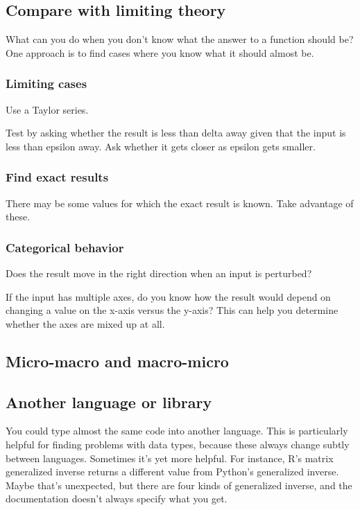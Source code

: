 \documentclass[fleqn,10pt]{olplainarticle}
\begin{document}
\subsection{Compare with limiting theory}\label{sec:limits}

What can you do when you don't know what the answer to
a function should be? One approach is to find cases
where you know what it should almost be.

\subsubsection{Limiting cases}
Use a Taylor series.

Test by asking whether the result is less than delta away
given that the input is less than epsilon away.
Ask whether it gets closer as epsilon gets smaller.


\subsubsection{Find exact results}
There may be some values for which the exact result
is known. Take advantage of these.

\subsubsection{Categorical behavior}
Does the result move in the right direction when an input is perturbed?

If the input has multiple axes, do you know how the result would
depend on changing a value on the x-axis versus the y-axis?
This can help you determine whether the axes are mixed up at all.


\subsection{Micro-macro and macro-micro}



\subsection{Another language or library}
You could type almost the same code into another language. This is 
particularly helpful for finding problems with data types, because
these always change subtly between languages. Sometimes it's yet more
helpful. For instance, R's matrix generalized inverse returns a different value
from Python's generalized inverse. Maybe that's unexpected, but there are four
kinds of generalized inverse, and the documentation doesn't always specify
what you get.
\end{document}
